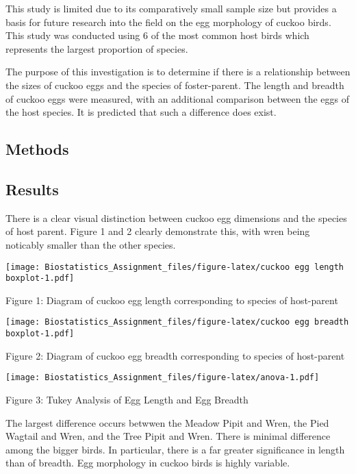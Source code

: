 \documentclass[]{article}
\begin{document}
This study is limited due to its comparatively small sample size but
provides a basis for future research into the field on the egg
morphology of cuckoo birds. This study was conducted using 6 of the most
common host birds which represents the largest proportion of species.

The purpose of this investigation is to determine if there is a
relationship between the sizes of cuckoo eggs and the species of
foster-parent. The length and breadth of cuckoo eggs were measured, with
an additional comparison between the eggs of the host species. It is
predicted that such a difference does exist.

\subsection{Methods}\label{methods}

\subsection{Results}\label{results}

There is a clear visual distinction between cuckoo egg dimensions and
the species of host parent. Figure 1 and 2 clearly demonstrate this,
with wren being noticably smaller than the other species.

\texttt{[image: Biostatistics\_Assignment\_files/figure-latex/cuckoo egg length boxplot-1.pdf]}

Figure 1: Diagram of cuckoo egg length corresponding to species of
host-parent

\texttt{[image: Biostatistics\_Assignment\_files/figure-latex/cuckoo egg breadth boxplot-1.pdf]}

Figure 2: Diagram of cuckoo egg breadth corresponding to species of
host-parent

\texttt{[image: Biostatistics\_Assignment\_files/figure-latex/anova-1.pdf]}

Figure 3: Tukey Analysis of Egg Length and Egg Breadth

The largest difference occurs betwwen the Meadow Pipit and Wren, the
Pied Wagtail and Wren, and the Tree Pipit and Wren. There is minimal
difference among the bigger birds. In particular, there is a far greater
significance in length than of breadth. Egg morphology in cuckoo birds
is highly variable.
\end{document}
